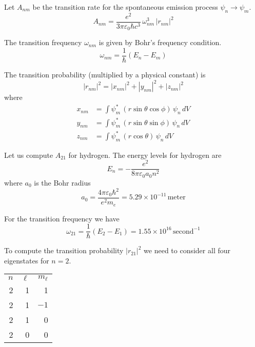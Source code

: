\documentclass[12pt]{article}
\begin{document}
\noindent
Let $A_{nm}$ be the transition rate for the spontaneous emission process $\psi_n\rightarrow\psi_m$.
\begin{equation*}
A_{nm}=\frac{e^2}{3\pi\varepsilon_0\hbar c^3}\,\omega_{nm}^3\,|r_{nm}|^2
\end{equation*}

\noindent
The transition frequency $\omega_{nm}$ is given by Bohr's frequency condition.
\begin{equation*}
\omega_{nm}=\frac{1}{\hbar}(E_n-E_m)
\end{equation*}

\noindent
The transition probability (multiplied by a physical constant) is
\begin{equation*}
|r_{nm}|^2
=|x_{nm}|^2
+|y_{nm}|^2
+|z_{nm}|^2
\end{equation*}
where
\begin{align*}
x_{nm}&=\int\psi_m^*\,(r\sin\theta\cos\phi)\,\psi_n\,dV
\\
y_{nm}&=\int\psi_m^*\,(r\sin\theta\sin\phi)\,\psi_n\,dV
\\
z_{nm}&=\int\psi_m^*\,(r\cos\theta)\,\psi_n\,dV
\end{align*}

\noindent
Let us compute $A_{21}$ for hydrogen.
The energy levels for hydrogen are
\begin{equation*}
E_n=-\frac{e^2}{8\pi\varepsilon_0 a_0n^2}
\end{equation*}
where $a_0$ is the Bohr radius
\begin{equation*}
a_0=\frac{4\pi\varepsilon_0\hbar^2}{e^2 m_e}
=5.29\times10^{-11}\,\text{meter}
\end{equation*}

\noindent
For the transition frequency we have
\begin{equation*}
\omega_{21}=\frac{1}{\hbar}(E_2-E_1)
=1.55\times10^{16}\,\text{second}^{-1}
\end{equation*}

\noindent
To compute the transition probability $|r_{21}|^2$ we need to
consider all four eigenstates for $n=2$.
\begin{center}
\begin{tabular}{rrr}
$n$ & $\ell$ & $m_\ell$\\
2 & 1 & 1 \\
2 & 1 & $-1$ \\
2 & 1 & 0 \\
2 & 0 & 0
\end{tabular}
\end{center}
\end{document}
